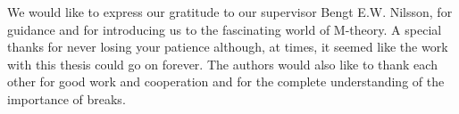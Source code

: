 We would like to express our gratitude to our supervisor Bengt E.W. Nilsson, for guidance and for introducing us to the 
fascinating world of M-theory. A special thanks for never losing your patience although, at times, it seemed 
like the work with this thesis could go on forever. The authors would also like to thank each other for good work and 
cooperation and for the complete understanding of the importance of breaks.



